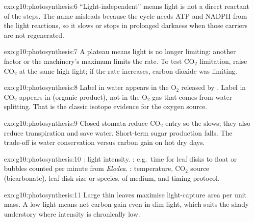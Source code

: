 \begin{solution}{exo:g10:photosynthesis:6}
``Light-independent'' means light is not a direct reactant of the 
 steps. The name misleads because the cycle needs ATP and NADPH from the
light reactions, so it slows or stops in prolonged darkness when those carriers
are not regenerated.
\end{solution}

\begin{solution}{exo:g10:photosynthesis:7}
A plateau means light is no longer limiting: another factor or the machinery's
maximum limits the rate. To test $\mathrm{CO_2}$ limitation, raise
$\mathrm{CO_2}$ at the same high light; if the rate increases, carbon dioxide
was limiting.
\end{solution}

\begin{solution}{exo:g10:photosynthesis:8}
Label in water appears in the $\mathrm{O_2}$ released by . Label in
$\mathrm{CO_2}$ appears in  (organic product), not in the
$\mathrm{O_2}$ gas that comes from water splitting. That is the classic
isotope evidence for the oxygen source.
\end{solution}

\begin{solution}{exo:g10:photosynthesis:9}
Closed stomata reduce $\mathrm{CO_2}$ entry so the  slows; they
also reduce transpiration and save water. Short-term sugar production falls.
The trade-off is water conservation versus carbon gain on hot dry days.
\end{solution}

\begin{solution}{exo:g10:photosynthesis:10}
: light intensity. : e.g.\ time for leaf
disks to float or bubbles counted per minute from \emph{Elodea}. : temperature, $\mathrm{CO_2}$ source (bicarbonate), leaf disk size
or species,  of medium, and timing protocol.
\end{solution}

\begin{solution}{exo:g10:photosynthesis:11}
Large thin leaves maximise light-capture area per unit mass. A low light
 means net carbon gain even in dim light, which suits the
shady understory where intensity is chronically low.
\end{solution}

